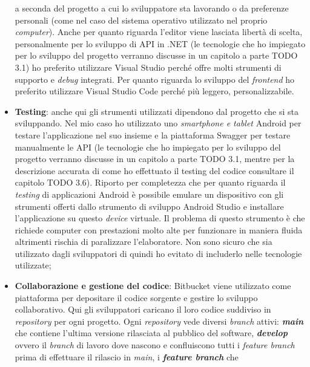 \begin{itemize}
            a seconda del progetto a cui lo sviluppatore sta lavorando o da preferenze personali (come nel caso del 
            sistema operativo utilizzato nel proprio \textit{computer}). Anche per quanto riguarda l'editor viene lasciata 
            libertà di scelta, personalmente per lo sviluppo di API in .NET (le tecnologie che ho impiegato per lo sviluppo del 
            progetto verranno discusse in un capitolo a parte TODO 3.1) ho preferito utilizzare Visual Studio perché offre 
            molti strumenti di supporto e \textit{debug} integrati. Per quanto riguarda lo sviluppo del \textit{frontend} ho 
            preferito utilizzare Visual Studio Code perché più leggero, personalizzabile.
      \item \textbf{Testing}: anche qui gli strumenti utilizzati dipendono dal progetto che si sta sviluppando. Nel mio 
            caso ho utilizzato uno \textit{smartphone e tablet} Android per testare l'applicazione nel suo insieme e la 
            piattaforma Swagger per testare manualmente le API (le tecnologie che ho impiegato per lo sviluppo del 
            progetto verranno discusse in un capitolo a parte TODO 3.1, mentre per la descrizione accurata di come ho 
            effettuato il testing del codice consultare il capitolo TODO 3.6). Riporto per completezza che per 
            quanto riguarda il \textit{testing} di applicazioni Android è possibile emulare un dispositivo con gli 
            strumenti offerti dallo strumento di sviluppo Android Studio e installare l'applicazione su questo \textit{device} 
            virtuale. Il problema di questo strumento è che richiede computer con prestazioni molto alte per funzionare 
            in maniera fluida altrimenti rischia di paralizzare l'elaboratore. Non sono sicuro che sia utilizzato dagli 
            sviluppatori di {\company} quindi ho evitato di includerlo nelle tecnologie utilizzate;
      \item \textbf{Collaborazione e gestione del codice}: Bitbucket viene utilizzato come piattaforma per depositare il codice 
            sorgente e gestire lo sviluppo collaborativo. Qui gli sviluppatori caricano il loro 
            codice suddiviso in \textit{repository} per ogni progetto. Ogni \textit{repository} vede diversi 
            \textit{branch} attivi: \textbf{\textit{main}} che contiene l'ultima versione rilasciata al pubblico del software, 
            \textbf{\textit{develop}} ovvero il \textit{branch} di lavoro dove nascono e confluiscono tutti i 
            \textit{feature branch} prima di effettuare il rilascio in \textit{main}, i \textbf{\textit{feature branch}} che 

\end{itemize}
